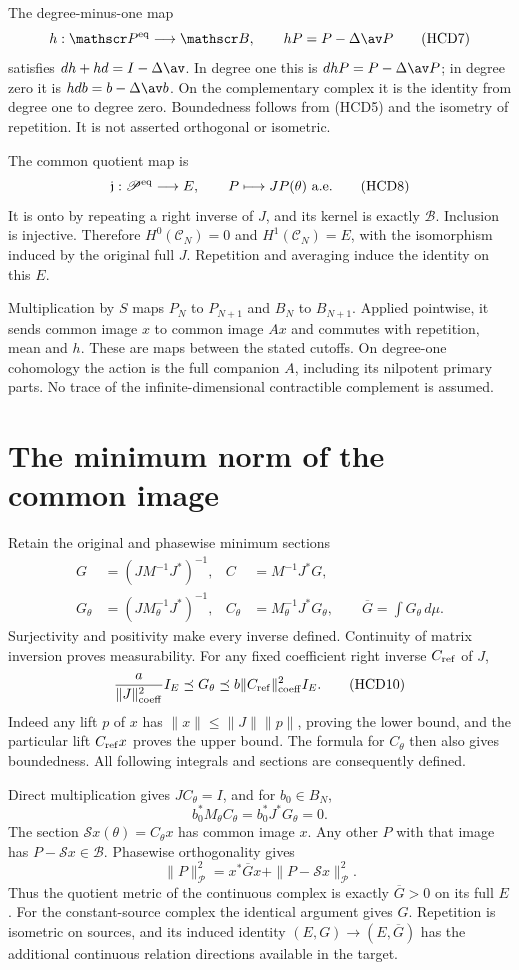 The degree-minus-one map
\[
 h:\mathscr P^{\rm eq}\longrightarrow\mathscr B,\qquad
 hP=P-\Delta\av P
 \tag{HCD7}
\]
satisfies $dh+hd=I-\Delta\av$. In degree one this is
$dhP=P-\Delta\av P$; in degree zero it is
$hd b=b-\Delta\av b$. On the complementary complex it
is the identity from degree one to degree zero. Boundedness
follows from (HCD5) and the isometry of repetition.
It is not asserted orthogonal or isometric.

The common quotient map is
\[
 \mathfrak j:\mathscr P^{\rm eq}\longrightarrow E,\qquad
 P\longmapsto JP(\theta)\text{ a.e.}
 \tag{HCD8}
\]
It is onto by repeating a right inverse of $J$, and its
kernel is exactly $\mathscr B$. Inclusion is injective.
Therefore $H^0(\mathscr C_N)=0$ and $H^1(\mathscr C_N)=E$,
with the isomorphism induced by the original full $J$.
Repetition and averaging induce the identity on this $E$.

Multiplication by $S$ maps $P_N$ to $P_{N+1}$ and $B_N$
to $B_{N+1}$. Applied pointwise, it sends common image $x$
to common image $Ax$ and commutes with repetition, mean
and $h$. These are maps between the stated cutoffs.
On degree-one cohomology the action is the full companion
$A$, including its nilpotent primary parts. No trace of
the infinite-dimensional contractible complement is assumed.

\section{The minimum norm of the common image}

Retain the original and phasewise minimum sections
\[
 \begin{aligned}
 G&=(JM^{-1}J^*)^{-1},& C&=M^{-1}J^*G,\\
 G_\theta&=(JM_\theta^{-1}J^*)^{-1},&
 C_\theta&=M_\theta^{-1}J^*G_\theta,\qquad
 \overline G=\int G_\theta\,d\mu.
 \end{aligned}
 \tag{HCD9}
\]
Surjectivity and positivity make every inverse defined.
Continuity of matrix inversion proves measurability.
For any fixed coefficient right inverse $C_{\rm ref}$ of $J$,
\[
 \frac{a}{\|J\|_{\rm coeff}^2}I_E
 \preceq G_\theta
 \preceq b\|C_{\rm ref}\|_{\rm coeff}^2I_E.
 \tag{HCD10}
\]
Indeed any lift $p$ of $x$ has
$\|x\|\le\|J\|\|p\|$, proving the lower bound, and the
particular lift $C_{\rm ref}x$ proves the upper bound.
The formula for $C_\theta$ then also gives boundedness.
All following integrals and sections are consequently defined.

Direct multiplication gives $JC_\theta=I$, and for $b_0\in B_N$,
\[
 b_0^*M_\theta C_\theta=b_0^*J^*G_\theta=0.
 \tag{HCD11}
\]
The section $\mathscr Sx(\theta)=C_\theta x$ has common image
$x$. Any other $P$ with that image has
$P-\mathscr Sx\in\mathscr B$. Phasewise orthogonality gives
\[
 \|P\|_{\mathscr P}^2
 =x^*\overline Gx+\|P-\mathscr Sx\|_{\mathscr P}^2.
 \tag{HCD12}
\]
Thus the quotient metric of the continuous complex is exactly
$\overline G>0$ on its full $E$. For the constant-source
complex the identical argument gives $G$. Repetition is
isometric on sources, and its induced identity
$(E,G)\to(E,\overline G)$ has the additional continuous
relation directions available in the target.

